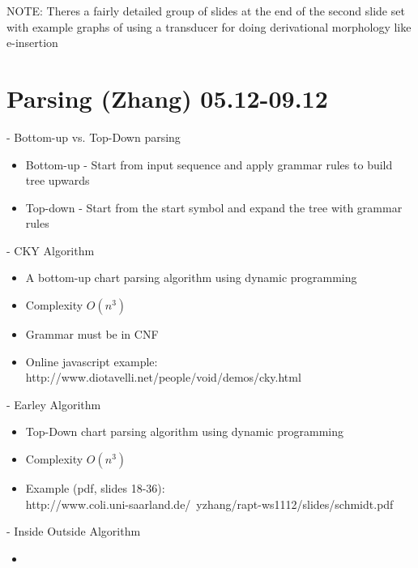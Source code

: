 \documentclass[11pt]{article}
\newenvironment{itemise}{
\begin{itemize}
  \setlength{\itemsep}{1pt}
  \setlength{\parskip}{0pt}
  \setlength{\parsep}{0pt}
}{\end{itemize}}
\begin{document}
NOTE: Theres a fairly detailed group of slides at the end of the second slide set with example graphs  of using a transducer for doing derivational morphology like e-insertion


\section{Parsing (Zhang) 05.12-09.12}

- Bottom-up vs. Top-Down parsing
\begin{itemise}
 \item Bottom-up - Start from input sequence and apply grammar rules to build tree upwards
 \item Top-down - Start from the start symbol and expand the tree with grammar rules
\end{itemise}
- CKY Algorithm
\begin{itemise}
 \item A bottom-up chart parsing algorithm using dynamic programming
 \item Complexity $O(n^3)$ 
 \item Grammar must be in CNF
 \item Online javascript example: http://www.diotavelli.net/people/void/demos/cky.html
\end{itemise}
- Earley Algorithm
\begin{itemise}
 \item Top-Down chart parsing algorithm using dynamic programming
 \item Complexity $O(n^3)$
 \item Example (pdf, slides 18-36): \\http://www.coli.uni-saarland.de/~yzhang/rapt-ws1112/slides/schmidt.pdf
\end{itemise}
- Inside Outside Algorithm
\begin{itemise}
 \item 
\end{itemise}
\end{document}
